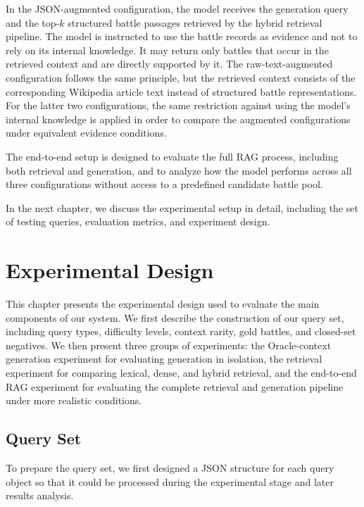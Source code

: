 In the JSON-augmented configuration, the model receives the generation query and the top-$k$ structured battle passages retrieved by the hybrid retrieval pipeline. The model is instructed to use the battle records as evidence and not to rely on its internal knowledge. It may return only battles that occur in the retrieved context and are directly supported by it. The raw-text-augmented configuration follows the same principle, but the retrieved context consists of the corresponding Wikipedia article text instead of structured battle representations. For the latter two configurations, the same restriction against using the model’s internal knowledge is applied in order to compare the augmented configurations under equivalent evidence conditions.

The end-to-end setup is designed to evaluate the full RAG process, including both retrieval and generation, and to analyze how the model performs across all three configurations without access to a predefined candidate battle pool.

In the next chapter, we discuss the experimental setup in detail, including the set of testing queries, evaluation metrics, and experiment design.
\chapter{Experimental Design}
This chapter presents the experimental design used to evaluate the main components of our system. We first describe the construction of our query set, including query types, difficulty levels, context rarity, gold battles, and closed-set negatives. We then present three groups of experiments: the Oracle-context generation experiment for evaluating generation in isolation, the retrieval experiment for comparing lexical, dense, and hybrid retrieval, and the end-to-end RAG experiment for evaluating the complete retrieval and generation pipeline under more realistic conditions.
\section{Query Set}
To prepare the query set, we first designed a JSON structure for each query object so that it could be processed during the experimental stage and later results analysis. 

